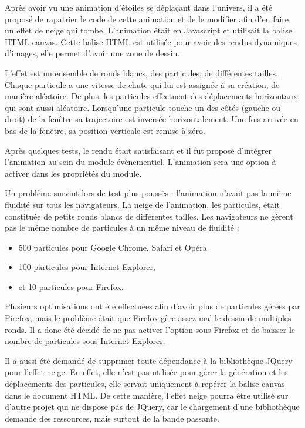\documentclass[12pt,a4paper]{article}
\begin{document}
\bigskip
Après avoir vu une animation d'étoiles se déplaçant dans l'univers, il a été proposé de rapatrier le code de cette animation et de le modifier afin d'en faire un effet de neige qui tombe. L'animation était en Javascript et utilisait la balise \gls{HTML} canvas. Cette balise \gls{HTML} est utilisée pour avoir des rendus dynamiques d'images, elle permet d'avoir une zone de dessin.\par 
L'effet est un ensemble de ronds blancs, des particules, de différentes tailles. Chaque particule a une vitesse de chute qui lui est assignée à sa création, de manière aléatoire. De plus, les particules effectuent des déplacements horizontaux, qui sont aussi aléatoire. Lorsqu'une particule touche un des côtés (gauche ou droit) de la fenêtre sa trajectoire est inversée horizontalement. Une fois arrivée en bas de la fenêtre, sa position verticale est remise à zéro.\par
Après quelques tests, le rendu était satisfaisant et il fut proposé d'intégrer l'animation au sein du module évènementiel. L'animation sera une option à activer dans les propriétés du module.\par 
Un problème survint lors de test plus poussés : l'animation n'avait pas la même fluidité sur tous les navigateurs. La neige de l'animation, les particules, était constituée de petits ronds blancs de différentes tailles. Les navigateurs ne gèrent pas le même nombre de particules à un même niveau de fluidité :
\begin{itemize}
\item 500 particules pour Google Chrome, Safari et Opéra
\item 100 particules pour Internet Explorer,
\item et 10 particules pour Firefox.
\end{itemize}\par 
Plusieurs optimisations ont été effectuées afin d'avoir plus de particules gérées par Firefox, mais le problème était que  Firefox gère assez mal le dessin de multiples ronds. Il a donc été décidé de ne pas activer l'option sous Firefox et de baisser le nombre de particules sous Internet Explorer.\par 
\medskip
Il a aussi été demandé de supprimer toute dépendance à la bibliothèque JQuery pour l'effet neige. En effet, elle n'est pas utilisée pour gérer la génération et les déplacements des particules, elle servait uniquement à repérer la balise canvas dans le document \gls{HTML}. De cette manière, l'effet neige pourra être utilisé sur d'autre projet qui ne dispose pas de JQuery, car le chargement d'une bibliothèque demande des ressources, mais surtout de la bande passante.\par
\end{document}
